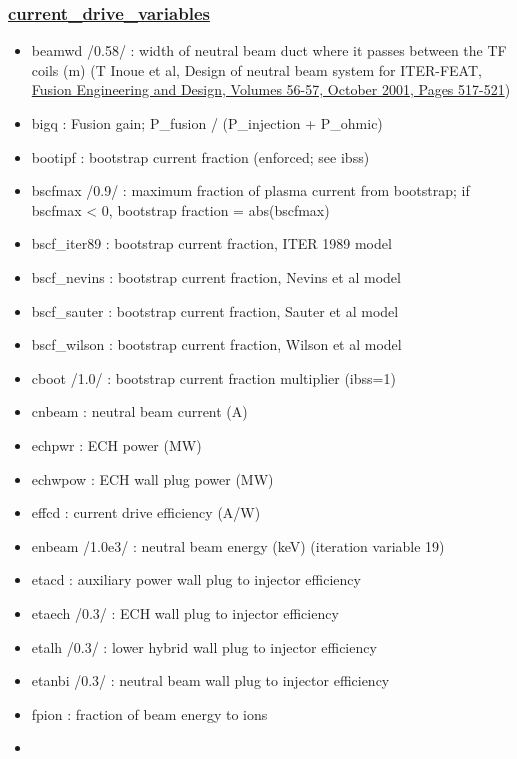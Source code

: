 \documentclass[]{article}
\begin{document}
\subsubsection{\href{current_drive_variables.html}{current\_drive\_variables}}

\begin{itemize}
\itemsep1pt\parskip0pt
\item
  beamwd /0.58/ : width of neutral beam duct where it passes between the
  TF coils (m) (T Inoue et al, Design of neutral beam system for
  ITER-FEAT,
  \href{http://dx.doi.org/10.1016/S0920-3796(01)00339-8}{Fusion
  Engineering and Design, Volumes 56-57, October 2001, Pages 517-521})
\item
  bigq : Fusion gain; P\_fusion / (P\_injection + P\_ohmic)
\item
  bootipf : bootstrap current fraction (enforced; see ibss)
\item
  bscfmax /0.9/ : maximum fraction of plasma current from bootstrap; if
  bscfmax \textless{} 0, bootstrap fraction = abs(bscfmax)
\item
  bscf\_iter89 : bootstrap current fraction, ITER 1989 model
\item
  bscf\_nevins : bootstrap current fraction, Nevins et al model
\item
  bscf\_sauter : bootstrap current fraction, Sauter et al model
\item
  bscf\_wilson : bootstrap current fraction, Wilson et al model
\item
  cboot /1.0/ : bootstrap current fraction multiplier (ibss=1)
\item
  cnbeam : neutral beam current (A)
\item
  echpwr : ECH power (MW)
\item
  echwpow : ECH wall plug power (MW)
\item
  effcd : current drive efficiency (A/W)
\item
  enbeam /1.0e3/ : neutral beam energy (keV) (iteration variable 19)
\item
  etacd : auxiliary power wall plug to injector efficiency
\item
  etaech /0.3/ : ECH wall plug to injector efficiency
\item
  etalh /0.3/ : lower hybrid wall plug to injector efficiency
\item
  etanbi /0.3/ : neutral beam wall plug to injector efficiency
\item
  fpion : fraction of beam energy to ions
\item

\end{itemize}
\end{document}
